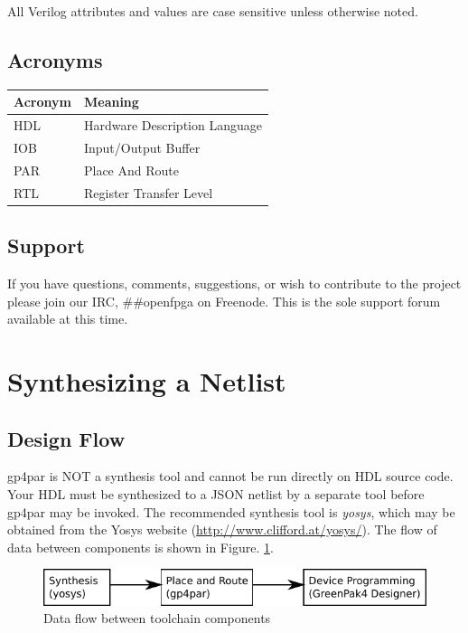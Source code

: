 \documentclass{article}
\begin{document}
All Verilog attributes and values are case sensitive unless otherwise noted.

\subsection{Acronyms}

\begin{tabularx}{4in}{|l|X|}
\hline
{\bfseries Acronym} & {\bfseries Meaning} \\
\hline
HDL & Hardware Description Language \\
\hline
IOB & Input/Output Buffer \\
\hline
PAR & Place And Route \\
\hline
RTL & Register Transfer Level \\
\hline
\end{tabularx}

\subsection{Support}

If you have questions, comments, suggestions, or wish to contribute to the project please join our IRC, \#\#openfpga on 
Freenode. This is the sole support forum available at this time.

\pagebreak
\section{Synthesizing a Netlist}

\subsection{Design Flow}

gp4par is NOT a synthesis tool and cannot be run directly on HDL source code. Your HDL must be synthesized to
a JSON netlist by a separate tool before gp4par may be invoked. The recommended synthesis tool is 
\emph{yosys}, which may be obtained from the Yosys website (\url{http://www.clifford.at/yosys/}). The flow of data 
between components is shown in Figure. \ref{flow}.

\begin{figure}[h]
\centering
\includegraphics[scale=1]{figures/flow.pdf}
\caption{Data flow between toolchain components}
\label{flow}
\end{figure}
\end{document}
